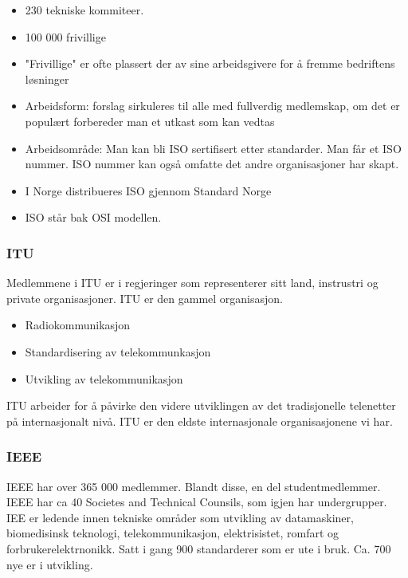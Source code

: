 \documentclass{article}
\begin{document}
\begin{flushleft}
        \begin{itemize}
            \item 230 tekniske kommiteer.
            \item 100 000 frivillige
            \item "Frivillige" er ofte plassert der av sine arbeidsgivere for å fremme bedriftens løsninger
            \item Arbeidsform: forslag sirkuleres til alle med fullverdig medlemskap, om det er populært forbereder man et utkast som kan vedtas
            \item Arbeidsområde: Man kan bli ISO sertifisert etter standarder. Man får et ISO nummer. ISO nummer kan også omfatte det andre organisasjoner har skapt.
            \item I Norge distribueres ISO gjennom Standard Norge
            \item ISO står bak OSI modellen.
        \end{itemize}

        \subsubsection{ITU}
        Medlemmene i ITU er i regjeringer som representerer sitt land, instrustri og private organisasjoner. 
        ITU er den gammel organisasjon. 
        \begin{itemize}
            \item Radiokommunikasjon
            \item Standardisering av telekommunkasjon
            \item Utvikling av telekommunikasjon
        \end{itemize}

        ITU arbeider for å påvirke den videre utviklingen av det tradisjonelle telenetter på internasjonalt nivå.
        ITU er den eldste internasjonale organisasjonene vi har. 

        \subsubsection{IEEE}
        IEEE har over 365 000 medlemmer. Blandt disse, en del studentmedlemmer. 
        IEEE har ca 40 Societes and Technical Counsils, som igjen har undergrupper. 
        IEE er ledende innen tekniske områder som utvikling av datamaskiner, biomedisinsk teknologi, telekommunikasjon, elektrisistet, romfart og forbrukerelektrnonikk.
        Satt i gang 900 standarderer som er ute i bruk. Ca. 700 nye er i utvikling. 
        

\end{flushleft}
\end{document}
